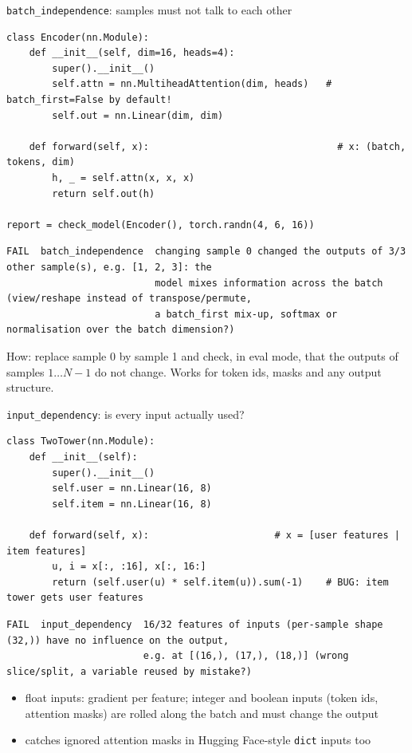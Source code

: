 \documentclass[aspectratio=169,11pt]{beamer}
\newcommand{\chk}[1]{\texttt{#1}}
\begin{document}
\begin{frame}[fragile]{\chk{batch\_independence}: samples must not talk to each other}
  \begin{lstlisting}
class Encoder(nn.Module):
    def __init__(self, dim=16, heads=4):
        super().__init__()
        self.attn = nn.MultiheadAttention(dim, heads)   # batch_first=False by default!
        self.out = nn.Linear(dim, dim)

    def forward(self, x):                                 # x: (batch, tokens, dim)
        h, _ = self.attn(x, x, x)
        return self.out(h)

report = check_model(Encoder(), torch.randn(4, 6, 16))
  \end{lstlisting}
  \begin{lstlisting}[style=report]
FAIL  batch_independence  changing sample 0 changed the outputs of 3/3 other sample(s), e.g. [1, 2, 3]: the
                          model mixes information across the batch (view/reshape instead of transpose/permute,
                          a batch_first mix-up, softmax or normalisation over the batch dimension?)
  \end{lstlisting}
  \small How: replace sample 0 by sample 1 and check, in eval mode, that the outputs of samples
  $1\ldots N{-}1$ do not change. Works for token ids, masks and any output structure.
\end{frame}

\begin{frame}[fragile]{\chk{input\_dependency}: is every input actually used?}
  \begin{lstlisting}
class TwoTower(nn.Module):
    def __init__(self):
        super().__init__()
        self.user = nn.Linear(16, 8)
        self.item = nn.Linear(16, 8)

    def forward(self, x):                      # x = [user features | item features]
        u, i = x[:, :16], x[:, 16:]
        return (self.user(u) * self.item(u)).sum(-1)    # BUG: item tower gets user features
  \end{lstlisting}
  \begin{lstlisting}[style=report]
FAIL  input_dependency  16/32 features of inputs (per-sample shape (32,)) have no influence on the output,
                        e.g. at [(16,), (17,), (18,)] (wrong slice/split, a variable reused by mistake?)
  \end{lstlisting}
  \begin{itemize}
    \item float inputs: gradient per \alert{feature}; integer and boolean inputs (token ids,
          attention masks) are rolled along the batch and must change the output
    \item catches ignored attention masks in Hugging Face-style \texttt{dict} inputs too
  \end{itemize}
\end{frame}
\end{document}
